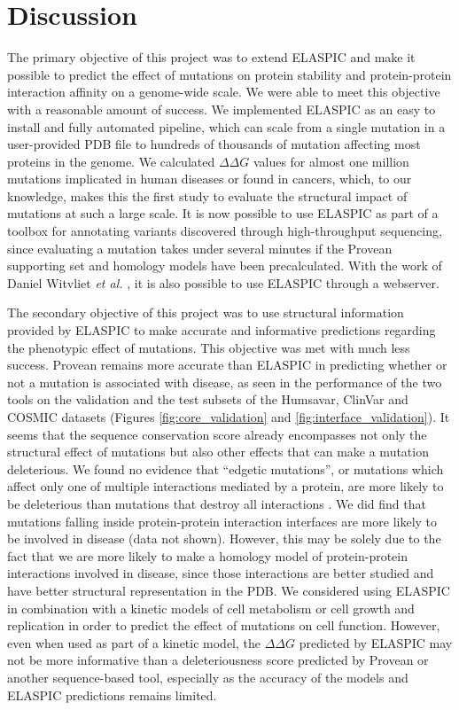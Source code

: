
\chapter{Discussion} \label{ch:discussion}

The primary objective of this project was to extend ELASPIC and make it possible to predict the effect of mutations on protein stability and protein-protein interaction affinity on a genome-wide scale. We were able to meet this objective with a reasonable amount of success. We implemented ELASPIC as an easy to install and fully automated pipeline, which can scale from a single mutation in a user-provided PDB file to hundreds of thousands of mutation affecting most proteins in the genome. We calculated $\Delta \Delta G$ values for almost one million mutations implicated in human diseases or found in cancers, which, to our knowledge, makes this the first study to evaluate the structural impact of mutations at such a large scale. It is now possible to use ELASPIC as part of a toolbox for annotating variants discovered through high-throughput sequencing, since evaluating a mutation takes under several minutes if the Provean supporting set and homology models have been precalculated.  With the work of Daniel Witvliet \textit{et al.} \cite{witvliet_elaspic_2016}, it is also possible to use ELASPIC through a webserver.

The secondary objective of this project was to use structural information provided by ELASPIC to make accurate and informative predictions regarding the phenotypic effect of mutations. This objective was met with much less success. Provean remains more accurate than ELASPIC in predicting whether or not a mutation is associated with disease, as seen in the performance of the two tools on the validation and the test subsets of the Humsavar, ClinVar and COSMIC datasets (Figures \ref{fig:core_validation} and \ref{fig:interface_validation}). It seems that the sequence conservation score already encompasses not only the structural effect of mutations but also other effects that can make a mutation deleterious. We found no evidence that ``edgetic mutations'', or mutations which affect only one of multiple interactions mediated by a protein, are more likely to be deleterious than mutations that destroy all interactions \cite{sahni_widespread_2015}. We did find that mutations falling inside protein-protein interaction interfaces are more likely to be involved in disease (data not shown). However, this may be solely due to the fact that we are more likely to make a homology model of protein-protein interactions involved in disease, since those interactions are better studied and have better structural representation in the PDB. We considered using ELASPIC in combination with a kinetic models of cell metabolism \cite{bordbar_personalized_2015} or cell growth and replication \cite{karr_whole-cell_2012} in order to predict the effect of mutations on cell function. However, even when used as part of a kinetic model, the $\Delta \Delta G$ predicted by ELASPIC may not be more informative than a deleteriousness score predicted by Provean or another sequence-based tool, especially as the accuracy of the models and ELASPIC predictions remains limited.

